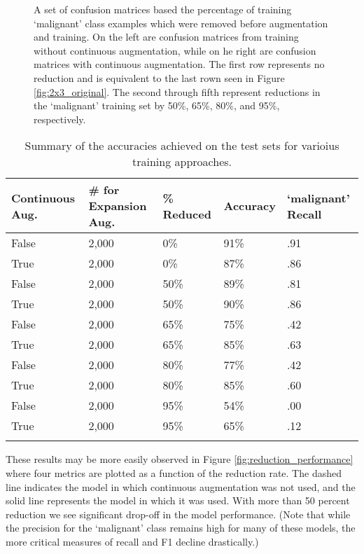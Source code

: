 \documentclass[sn-mathphys,Numbered]{sn-jnl}%
\theoremstyle{thmstyleone}%
\theoremstyle{thmstyletwo}%
\theoremstyle{thmstylethree}%
\begin{document}
\begin{figure}[!htbp]
    \centering


    \caption{A set of confusion matrices based the percentage of training `malignant' class examples which were removed before augmentation and training.  On the left are confusion matrices from training without continuous augmentation, while on he right are confusion matrices with continuous augmentation.  The first row represents no reduction and is equivalent to the last rown seen in Figure \ref{fig:2x3_original}.  The second through fifth represent reductions in the `malignant' training set by 50\%, 65\%, 80\%, and 95\%, respectively.}
    \label{fig:2x5_reductions}
\end{figure}

\begin{table}[h]
\caption{Summary of the accuracies achieved on the test sets for varioius training approaches.}\label{datareductions}
\begin{tabular}{@{}lllll@{}}%
\toprule
Continuous Aug. & \# for Expansion Aug.  & \% Reduced&  Accuracy & `malignant' Recall\\
\midrule
False & 2,000 & 0\%& 91\% & .91 \\
True & 2,000 & 0\%& 87\% & .86 \\
False & 2,000 & 50\%& 89\% & .81 \\
True & 2,000 & 50\%& 90\% & .86 \\
False & 2,000 & 65\%& 75\% & .42 \\
True & 2,000 &65\%& 85\% & .63 \\
False & 2,000 & 80\%& 77\% & .42 \\
True & 2,000 & 80\%& 85\% & .60 \\
False & 2,000 & 95\%& 54\% & .00 \\
True & 2,000 &95\%& 65\% & .12 \\
\botrule
\end{tabular}
\end{table}

These results may be more easily observed in Figure \ref{fig:reduction_performance} where four metrics are plotted as a function of the reduction rate.  The dashed line indicates the model in which continuous augmentation was not used, and the solid line represents the model in which it was used.  With more than 50 percent reduction we see significant drop-off in the model performance.  (Note that while the precision for the `malignant' class remains high for many of these models, the more critical measures of recall and F1 decline drastically.) 
\end{document}
